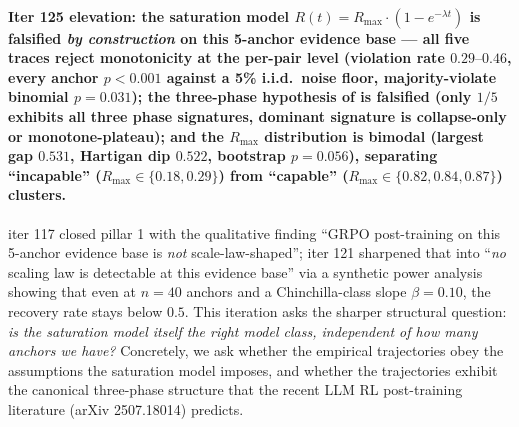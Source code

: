 \paragraph{Iter 125 elevation: the saturation model $R(t) = R_\mathrm{max} \cdot (1 - e^{-\lambda t})$ is falsified \emph{by construction} on this 5-anchor evidence base --- all five traces reject monotonicity at the per-pair level (violation rate $0.29\text{--}0.46$, every anchor $p < 0.001$ against a 5\% i.i.d.\ noise floor, majority-violate binomial $p = 0.031$); the three-phase hypothesis of \citet{arXiv2507.18014} is falsified (only $1/5$ exhibits all three phase signatures, dominant signature is collapse-only or monotone-plateau); and the $R_\mathrm{max}$ distribution is bimodal (largest gap $0.531$, Hartigan dip $0.522$, bootstrap $p = 0.056$), separating ``incapable'' ($R_\mathrm{max} \in \{0.18, 0.29\}$) from ``capable'' ($R_\mathrm{max} \in \{0.82, 0.84, 0.87\}$) clusters.}
\label{par:scaling-iter125}

iter 117 closed pillar 1 with the qualitative finding ``GRPO
post-training on this 5-anchor evidence base is \emph{not}
scale-law-shaped''; iter 121 sharpened that into ``\emph{no} scaling
law is detectable at this evidence base'' via a synthetic power
analysis showing that even at $n = 40$ anchors and a Chinchilla-class
slope $\beta = 0.10$, the recovery rate stays below $0.5$.  This
iteration asks the sharper structural question: \emph{is the
saturation model itself the right model class, independent of how
many anchors we have?}  Concretely, we ask whether the empirical
trajectories obey the assumptions the saturation model imposes, and
whether the trajectories exhibit the canonical three-phase structure
that the recent LLM RL post-training literature (arXiv 2507.18014)
predicts.

